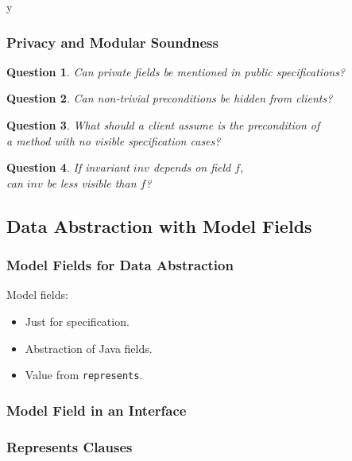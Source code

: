 \if y\MAKEHANDOUTS \documentclass[t,compress,landscape,handout]{beamer}
\newtheorem*{question}{Question}
\newcommand{\inv}{{\textit{inv}}}
\begin{document}
\begin{frame}
\frametitle{Privacy and Modular Soundness}
\begin{question}
Can private fields be mentioned in public specifications?
\end{question}

\pause
\begin{question}
Can non-trivial preconditions be hidden from clients?
\end{question}

\pause
\begin{question}
What should a client assume is the precondition of \\
a method with no visible specification cases?
\end{question}

\pause
\begin{question}
If invariant $\inv$ depends on field $f$, \\
can $\inv$ be less visible than $f$?
\end{question}
\end{frame}

\subsection[Model]{Data Abstraction with Model Fields}

\begin{frame}[fragile]
\frametitle{Model Fields for Data Abstraction}

Model fields:
\begin{itemize}
\item
Just for specification.

\item
Abstraction of Java fields.

\item
Value from \lstinline!represents!.
\end{itemize}
\end{frame}

\begin{frame}[fragile]
\frametitle{Model Field in an Interface}

\end{frame}

\begin{frame}[fragile]
\frametitle{Represents Clauses}

\end{frame}
\end{document}
